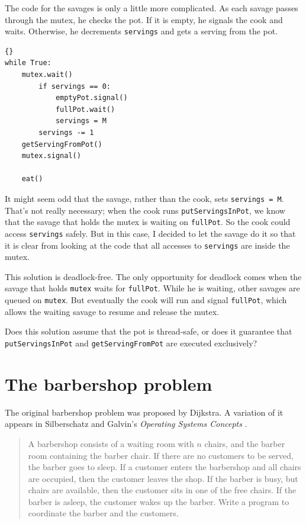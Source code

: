 \documentclass{book}
\begin{document}
The code for the savages is only a little more complicated.
As each savage passes through the mutex, he checks the pot.
If it is empty, he signals the cook and waits.  Otherwise,
he decrements {\tt servings} and gets a serving from the pot.

\newpage
\begin{lstlisting}[title={Dining Savages solution (savage)}]{}
while True:
    mutex.wait()
        if servings == 0:
            emptyPot.signal()
            fullPot.wait()
            servings = M
        servings -= 1
	getServingFromPot()
    mutex.signal()

    eat()
\end{lstlisting}

It might seem odd that the savage, rather than the cook, sets
    {\tt servings = M}.  That's not really necessary; when the cook
runs {\tt putServingsInPot}, we know that the savage that holds
the mutex is waiting on {\tt fullPot}.  So the cook could
access {\tt servings} safely.  But in this case, I decided to
let the savage do it so that it is clear from looking at the
code that all accesses to {\tt servings} are inside the mutex.

This solution is deadlock-free.  The only opportunity for
deadlock comes when the savage that holds {\tt mutex} waits
for {\tt fullPot}.  While he is waiting, other savages are
queued on {\tt mutex}.  But eventually the cook will run and
signal {\tt fullPot}, which allows the waiting savage
to resume and release the mutex.

Does this solution assume that the pot is thread-safe, or does it
guarantee that {\tt putServingsInPot} and {\tt getServingFromPot}
are executed exclusively?



\section{The barbershop problem}

The original barbershop problem was proposed by
Dijkstra.  A variation of it appears in
Silberschatz and Galvin's {\em Operating Systems Concepts}
\cite{silberschatz}.

\begin {quotation}
A barbershop consists of a waiting room with $n$ chairs, and the
barber room containing the barber chair.  If there are no customers to
be served, the barber goes to sleep.  If a customer enters the
barbershop and all chairs are occupied, then the customer leaves the
shop.  If the barber is busy, but chairs are available, then the
customer sits in one of the free chairs.  If the barber is asleep, the
customer wakes up the barber.  Write a program to coordinate the
barber and the customers.
\end{quotation}
\end{document}
